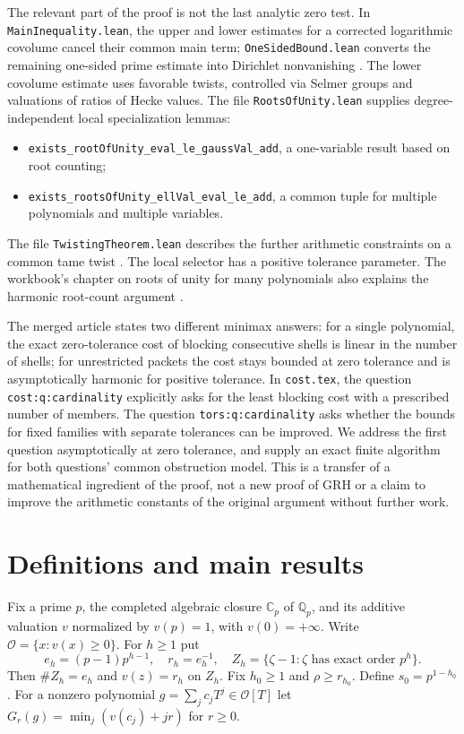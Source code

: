 \documentclass[11pt]{article}
\theoremstyle{remark}\newtheorem{remark}[theorem]{Remark}
\newcommand{\Cp}{\mathbb C_p}
\newcommand{\OO}{\mathcal O}
\newcommand{\Q}{\mathbb Q}
\newcommand{\code}[1]{\texttt{#1}}
\begin{document}
The relevant part of the proof is not the last analytic zero test. In \code{MainInequality.lean}, the upper and lower estimates for a corrected logarithmic covolume cancel their common main term; \code{OneSidedBound.lean} converts the remaining one-sided prime estimate into Dirichlet nonvanishing \cite{inequality,onesided}. The lower covolume estimate uses favorable twists, controlled via Selmer groups and valuations of ratios of Hecke values. The file \code{RootsOfUnity.lean} supplies degree-independent local specialization lemmas:
\begin{itemize}
\item \code{exists\_rootOfUnity\_eval\_le\_gaussVal\_add}, a one-variable result based on root counting;
\item \code{exists\_rootsOfUnity\_ellVal\_eval\_le\_add}, a common tuple for multiple polynomials and multiple variables.
\end{itemize}
The file \code{TwistingTheorem.lean} describes the further arithmetic constraints on a common tame twist \cite{roots,twisting}. The local selector has a positive tolerance parameter. The workbook's chapter on roots of unity for many polynomials also explains the harmonic root-count argument \cite{workbook}.

The merged article \cite{article,artcost,arttors} states two different minimax answers: for a single polynomial, the exact zero-tolerance cost of blocking consecutive shells is linear in the number of shells; for unrestricted packets the cost stays bounded at zero tolerance and is asymptotically harmonic for positive tolerance. In \code{cost.tex}, the question \code{cost:q:cardinality} explicitly asks for the least blocking cost with a prescribed number of members. The question \code{tors:q:cardinality} asks whether the bounds for fixed families with separate tolerances can be improved. We address the first question asymptotically at zero tolerance, and supply an exact finite algorithm for both questions' common obstruction model. This is a transfer of a mathematical ingredient of the proof, not a new proof of GRH or a claim to improve the arithmetic constants of the original argument without further work.

\section{Definitions and main results}
Fix a prime $p$, the completed algebraic closure $\Cp$ of $\Q_p$, and its additive valuation $v$ normalized by $v(p)=1$, with $v(0)=+\infty$. Write $\OO=\{x:v(x)\ge0\}$. For $h\ge1$ put
\[
 e_h=(p-1)p^{h-1},\quad r_h=e_h^{-1},\quad
 Z_h=\{\zeta-1: \zeta\text{ has exact order }p^h\}.
\]
Then $\#Z_h=e_h$ and $v(z)=r_h$ on $Z_h$. Fix $h_0\ge1$ and $\rho\ge r_{h_0}$. Define $s_0=p^{1-h_0}$. For a nonzero polynomial $g=\sum_j c_jT^j\in\OO[T]$ let $G_r(g)=\min_j(v(c_j)+jr)$ for $r\ge0$.
\end{document}
